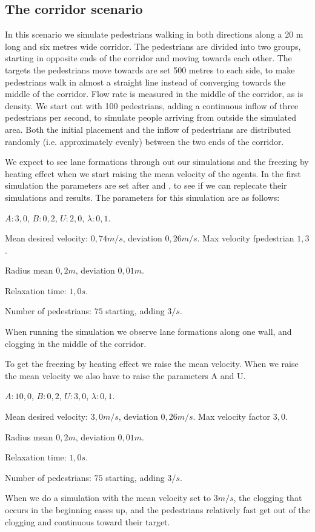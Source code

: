 \subsection{The corridor scenario}
In this scenario we simulate pedestrians walking in both directions along a 20 
m long and six metres wide corridor. The pedestrians are divided into two 
groups, starting in opposite ends of the corridor and moving towards each 
other. The targets the pedestrians move towards are set 500 metres to each 
side, to make pedestrians walk in almost a straight line instead of converging 
towards the middle of the corridor. Flow rate is measured in the middle of the 
corridor, as is density. We start out with 100 pedestrians, adding a 
continuous inflow of three pedestrians per second, to simulate people arriving 
from outside the simulated area. Both the initial placement and the inflow of 
pedestrians are distributed randomly (i.e. approximately evenly) between the 
two ends of the corridor.

We expect to see lane formations through out our simulations
and the freezing by heating effect when we start raising the mean velocity
of the agents.
In the first simulation the parameters are set after \cite{ABconstant} and
\cite{self-org}, to see if we can replecate their simulations and results.
The parameters for this simulation are as follows:

\begin{itemize*}
    \item $A: 3,0$, $B: 0,2$, $U: 2,0$, $\lambda: 0,1$.
    \item Mean desired velocity: $0,74 m/s$, deviation $0,26 m/s$. Max 
        velocity fpedestrian $1,3$.
    \item Radius mean $0,2 m$, deviation $0,01 m$.
    \item Relaxation time: $1,0 s$.
    \item Number of pedestrians: $75$ starting, adding $3/s$.
\end{itemize*}

When running the simulation we observe lane formations along one wall, and clogging
in the middle of the corridor.

To get the freezing by heating effect we raise the mean velocity. 
When we raise the mean velocity we also have to raise the parameters A and U.

\begin{itemize*}
    \item $A: 10,0$, $B: 0,2$, $U: 3,0$, $\lambda: 0,1$.
    \item Mean desired velocity: $3,0 m/s$, deviation $0,26 m/s$. Max 
        velocity factor $3,0$.
    \item Radius mean $0,2 m$, deviation $0,01 m$.
    \item Relaxation time: $1,0 s$.
    \item Number of pedestrians: $75$ starting, adding $3/s$.
\end{itemize*}

When we do a simulation with the mean velocity set to $3 m/s$, the clogging
that occurs in the beginning eases up, and the pedestrians relatively fast
get out of the clogging and continuous toward their target.

